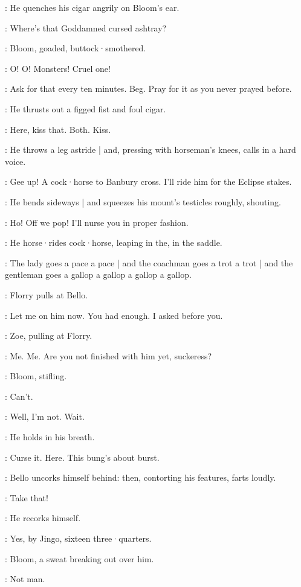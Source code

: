 :
He quenches his cigar angrily on Bloom's ear.

\Bello:
Where's that Goddamned cursed ashtray?

:
Bloom,
goaded,
buttock·smothered.

\Bloom:
O!
O!
Monsters!
Cruel one!

\Bello:
Ask for that every ten minutes.
Beg.
Pray for it as you never prayed before.

:
He thrusts out a figged fist and foul cigar.

\Bello:
Here,
kiss that.
Both.
Kiss.

:
He throws a leg astride |
and,
pressing with horseman's knees,
calls in a hard voice.

\Bello:
Gee up!
A cock·horse to Banbury cross.
I'll ride him for the Eclipse stakes.

:
He bends sideways |
and squeezes his mount's testicles roughly,
shouting.

\Bello:
Ho!
Off we pop!
I'll nurse you in proper fashion.

:
He horse·rides cock·horse,
leaping in the,
in the saddle.

\Bello:
The lady goes a pace a pace |
and the coachman goes a trot a trot |
and the gentleman goes a gallop a gallop a gallop a gallop.

:
Florry pulls at Bello.

\Florry:
Let me on him now.
You had enough.
I asked before you.

:
Zoe,
pulling at Florry.

\Zoe:
Me.
Me.
Are you not finished with him yet,
suckeress?

:
Bloom,
stifling.

\Bloom:
Can't.

\Bello:
Well,
I'm not.
Wait.

:
He holds in his breath.

\Bello:
Curse it.
Here.
This bung's about burst.

:
Bello uncorks himself behind:
then,
contorting his features,
farts loudly.


\Bello:
Take that!

:
He recorks himself.

\Bello:
Yes,
by Jingo,
sixteen three·quarters.%

:
Bloom,
a sweat breaking out over him.

\Bloom:
Not man.

